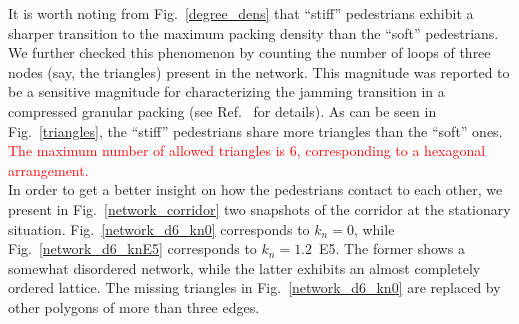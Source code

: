\documentclass[preprint,12pt]{elsarticle}
\begin{document}
It is worth noting from Fig.~\ref{degree_dens} that ``stiff''
pedestrians exhibit a sharper transition to the maximum packing density than 
the ``soft'' pedestrians. We further checked this phenomenon by counting the 
number of loops of three nodes (say, the triangles) present in the network. 
This magnitude was reported to be a sensitive magnitude for characterizing the 
jamming transition in a compressed granular packing (see 
Ref.~\cite{pugnaloni_2013} for details).  As can be seen in 
Fig.~\ref{triangles}, the ``stiff'' pedestrians share more triangles 
than the ``soft'' ones.\textcolor{red}{ The maximum number of allowed triangles is 6, 
corresponding to a hexagonal arrangement.}    \\

In order to get a better insight on how the pedestrians contact to each other, 
we present in Fig.~\ref{network_corridor} two snapshots of the corridor at the 
stationary situation. Fig.~\ref{network_d6_kn0} corresponds to 
$k_n=0$, while Fig.~\ref{network_d6_knE5} corresponds to $k_n=1.2$~E5. The 
former shows a somewhat disordered network, while the latter exhibits an almost 
completely ordered lattice. The missing triangles in Fig.~\ref{network_d6_kn0} 
are replaced by other polygons of more than three edges.    \\
\end{document}
